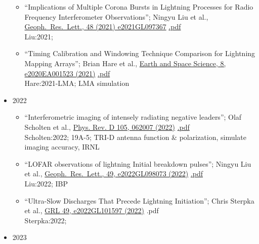 \documentclass[fleqn,11pt]{article}
\begin{document}
\begin{itemize}
\begin{itemize}
\item ``Implications of Multiple Corona Bursts in Lightning Processes for Radio Frequency Interferometer Observations''; Ningyu Liu et al.,
 \href{https://doi.org/10.1029/2021GL097367}{Geoph.\ Res.\ Lett., 48 (2021) e2021GL097367}
\href{https://drive.google.com/file/d/1CberVxlTCfkoX_lBrbzl3hYMrEZU0aPI/view?usp=sharing}{.pdf}
\\Liu:2021;

\item ``Timing Calibration and Windowing Technique Comparison for Lightning Mapping Arrays''; Brian Hare et al.,
 \href{https://doi.org/10.1029/2020EA001523}{Earth and Space Science, 8, e2020EA001523 (2021)}
\href{https://drive.google.com/file/d/15urHwVZXfel0uyUzWu4ewdt0grnUBFU0/view?usp=sharing}{.pdf}
\\Hare:2021-LMA; LMA simulation

\end{itemize}

\item{2022}
\begin{itemize}

\item ``Interferometric imaging of intensely radiating negative leaders''; Olaf Scholten et al.,  \href{https://doi.org/10.1103/PhysRevD.105.062007}{Phys. Rev. D 105, 062007  (2022)}
    \href{https://drive.google.com/file/d/1PbEqehbKbr3qaUwMkZkkWnwzt8WfMe9h/view?usp=sharing}{.pdf}
    \\Scholten:2022; 19A-5; TRI-D antenna function \& polarization, simulate imaging accuracy, IRNL

\item ``LOFAR observations of lightning Initial breakdown pulses''; Ningyu Liu et al., \href{https://doi.org/10.1029/2022GL098073}{Geoph.\ Res.\ Lett., 49, e2022GL098073 (2022)}
    \href{https://drive.google.com/file/d/1d6TCCdg21TRj5sqfX25mzrnUxmd06VG6/view?usp=sharing}{.pdf}
    \\Liu:2022; IBP

\item ``Ultra-Slow Discharges That Precede Lightning Initiation''; Chris Sterpka et al.,
    \href{https://doi.org/10.1029/2022GL101597}{GRL 49, e2022GL101597 (2022)}
    {.pdf}
    \\Sterpka:2022;

\end{itemize}

\item{2023}
\begin{itemize}


\end{itemize}
\end{itemize}
\end{document}
